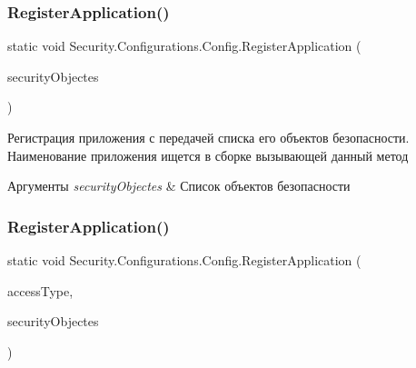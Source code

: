 \subsubsection{\texorpdfstring{Register\+Application()}{RegisterApplication()}\hspace{0.1cm}{\footnotesize\ttfamily [1/4]}}
{\footnotesize\ttfamily static void Security.\+Configurations.\+Config.\+Register\+Application (\begin{DoxyParamCaption}\item[{params \hyperlink{interface_security_1_1_interfaces_1_1_i_security_objects}{I\+Security\+Objects} \mbox{[}$\,$\mbox{]}}]{security\+Objectes }\end{DoxyParamCaption})\hspace{0.3cm}{\ttfamily [static]}}



Регистрация приложения с передачей списка его объектов безопасности. Наименование приложения ищется в сборке вызывающей данный метод 


\begin{DoxyParams}{Аргументы}
{\em security\+Objectes} & Список объектов безопасности\\
\hline
\end{DoxyParams}
\mbox{\label{class_security_1_1_configurations_1_1_config_a6e83390ad4628a39588e4987b7acb1b8}} 
\subsubsection{\texorpdfstring{Register\+Application()}{RegisterApplication()}\hspace{0.1cm}{\footnotesize\ttfamily [2/4]}}
{\footnotesize\ttfamily static void Security.\+Configurations.\+Config.\+Register\+Application (\begin{DoxyParamCaption}\item[{Type}]{access\+Type,  }\item[{params \hyperlink{interface_security_1_1_interfaces_1_1_i_security_objects}{I\+Security\+Objects} \mbox{[}$\,$\mbox{]}}]{security\+Objectes }\end{DoxyParamCaption})\hspace{0.3cm}{\ttfamily [static]}}



